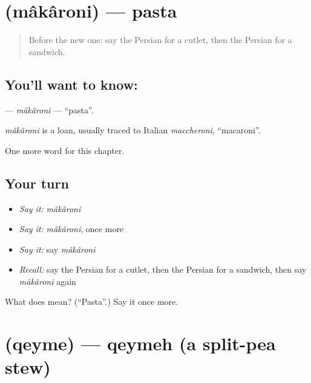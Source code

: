 \section[\texorpdfstring{\fa{ماکارونی} (mâkâroni)}{ماکارونی (mâkâroni)}]{ (mâkâroni) — pasta}

\label{lesson:FA-C205-makaroni}



\begin{quote}
Before the new one: say the Persian for a cutlet, then the Persian for a sandwich.
\end{quote}

\subsection*{You'll want to know: }
\textbf{} — \emph{mâkâroni} — \textquotedblleft{}pasta\textquotedblright{}.

\begin{cousinweb}
\emph{mâkâroni} is a loan, usually traced to Italian \emph{maccheroni}, \textquotedblleft{}macaroni\textquotedblright{}.
\end{cousinweb}

\begin{grammarlens}[title={What you've built}]
One more word for this chapter.
\end{grammarlens}

\subsection*{Your turn}
\begin{itemize}
\raggedright
  \item \emph{Say it:} \emph{mâkâroni}
  \item \emph{Say it:} \emph{mâkâroni}, once more
  \item \emph{Say it:} say \emph{mâkâroni}
  \item \emph{Recall:} say the Persian for a cutlet, then the Persian for a sandwich, then say \emph{mâkâroni} again
\end{itemize}

\begin{tcolorbox}[breakable,colback=teal!4,colframe=teal!35!black,title={Before you move on}]
What does  mean? (\textquotedblleft{}Pasta\textquotedblright{}.) Say it once more.
\end{tcolorbox}
\section[\texorpdfstring{\fa{قیمه} (qeyme)}{قیمه (qeyme)}]{ (qeyme) — qeymeh (a split-pea stew)}

